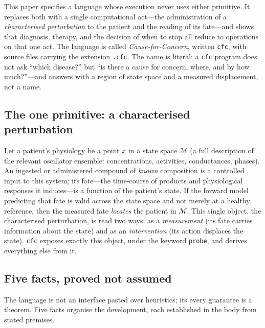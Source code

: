 \documentclass[11pt,a4paper]{article}
\theoremstyle{cfcthm}
\theoremstyle{definition}
\theoremstyle{remark}
\newcommand{\Man}{\mathcal{M}}          %
\newcommand{\st}{x}                     %
\newcommand{\cf}[1]{\texttt{#1}}
\begin{document}
This paper specifies a language whose execution never uses either primitive.
It replaces both with a single computational act---the administration of a
\emph{characterised perturbation} to the patient and the reading of its
fate---and shows that diagnosis, therapy, and the decision of when to stop all
reduce to operations on that one act. The language is called
\emph{Cause-for-Concern}, written \cf{cfc}, with source files carrying the
extension \cf{.cfc}. The name is literal: a \cf{cfc} program does not ask
``which disease?'' but ``is there a cause for concern, where, and by how
much?''---and answers with a region of state space and a measured
displacement, not a name.

\subsection{The one primitive: a characterised perturbation}

Let a patient's physiology be a point $\st$ in a state space $\Man$ (a full
description of the relevant oscillator ensemble: concentrations, activities,
conductances, phases). An ingested or administered compound of \emph{known}
composition is a controlled input to this system; its fate---the time-course
of products and physiological responses it induces---is a function of the
patient's state. If the forward model predicting that fate is valid across the
state space and not merely at a healthy reference, then the measured fate
\emph{locates} the patient in $\Man$. This single object, the characterised
perturbation, is read two ways: as a \emph{measurement} (its fate carries
information about the state) and as an \emph{intervention} (its action
displaces the state). \cf{cfc} exposes exactly this object, under the keyword
\cf{probe}, and derives everything else from it.

\subsection{Five facts, proved not assumed}

The language is not an interface pasted over heuristics; its every guarantee
is a theorem. Five facts organise the development, each established in the
body from stated premises.
\end{document}
